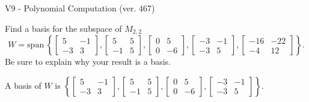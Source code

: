 \begin{exercise}
  \begin{exerciseTitle}V9 - Polynomial Computation (ver. 467)\end{exerciseTitle}
  \begin{exerciseStatement}
    Find a basis for the subspace of \(M_{2,2}\) 
\[W=\mathrm{span}\ \left\{\left[\begin{array}{cc}
5 & -1 \\
-3 & 3
\end{array}\right] , \left[\begin{array}{cc}
5 & 5 \\
-1 & 5
\end{array}\right] , \left[\begin{array}{cc}
0 & 5 \\
0 & -6
\end{array}\right] , \left[\begin{array}{cc}
-3 & -1 \\
-3 & 5
\end{array}\right] , \left[\begin{array}{cc}
-16 & -22 \\
-4 & 12
\end{array}\right]\right\}.\]
 Be sure to explain why your result is a basis.


  \end{exerciseStatement}
  \begin{exerciseAnswer}
   A basis of \(W\) is  \(\left\{\left[\begin{array}{cc}
5 & -1 \\
-3 & 3
\end{array}\right] , \left[\begin{array}{cc}
5 & 5 \\
-1 & 5
\end{array}\right] , \left[\begin{array}{cc}
0 & 5 \\
0 & -6
\end{array}\right] , \left[\begin{array}{cc}
-3 & -1 \\
-3 & 5
\end{array}\right]\right\}\).
  


  \end{exerciseAnswer}
\end{exercise}